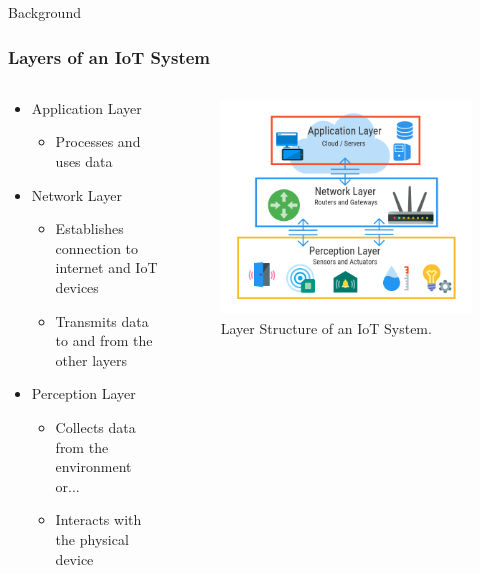\documentclass{beamer}
\begin{document}
\begin{frame}{Background}
  \frametitle{Layers of an IoT System}
  \begin{columns}
    \begin{column}{0.6\textwidth}
      \begin{itemize}
        \item Application Layer
          \begin{itemize}
            \item Processes and uses data
          \end{itemize}
        \item Network Layer
          \begin{itemize}
            \item Establishes connection to internet and IoT devices
            \item Transmits data to and from the other layers
          \end{itemize}
        \item Perception Layer
          \begin{itemize}
            \item Collects data from the environment or...
            \item Interacts with the physical device
          \end{itemize}
      \end{itemize}
    \end{column}
    \begin{column}{0.4\textwidth}
      \begin{figure}[htbp]
        \centering
        \includegraphics[width=\textwidth]{three-layer-iot-architecture.png}
        \caption{Layer Structure of an IoT System.\cite{Calihman_2021}}
        \label{fig:IoT_Layers}
      \end{figure}
  \end{column}
  \end{columns}
\end{frame}
\end{document}
